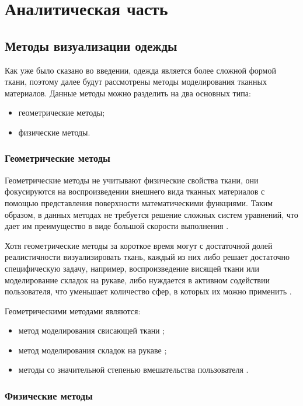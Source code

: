 \chapter{Аналитическая часть}

\section{Методы визуализации одежды}

Как уже было сказано во введении, одежда является более сложной формой ткани,
поэтому далее будут рассмотрены методы моделирования тканных материалов.
Данные методы можно разделить на два основных типа:
\begin{itemize}[left=\parindent]
    \item геометрические методы;
    \item физические методы.
\end{itemize}

\subsection{Геометрические методы}

Геометрические методы не учитывают физические свойства ткани, они фокусируются
на воспроизведении внешнего вида тканных материалов с помощью представления
поверхности математическими функциями. Таким образом, в данных методах не
требуется решение сложных систем уравнений, что дает им преимущество в виде
большой скорости выполнения \cite{bib07}.

Хотя геометрические методы за короткое время могут с достаточной долей
реалистичности визуализировать ткань, каждый из них либо решает достаточно
специфическую задачу, например, воспроизведение висящей ткани или моделирование
складок на рукаве, либо нуждается в активном содействии пользователя, что
уменьшает количество сфер, в которых их можно применить \cite{bib07}.

Геометрическими методами являются:
\begin{itemize}[left=\parindent]
    \item метод моделирования свисающей ткани \cite{bib08};
    \item метод моделирования складок на рукаве \cite{bib07};
    \item методы со значительной степенью вмешательства пользователя
        \cite{bib09}\cite{bib10}.
\end{itemize}

\subsection{Физические методы}

